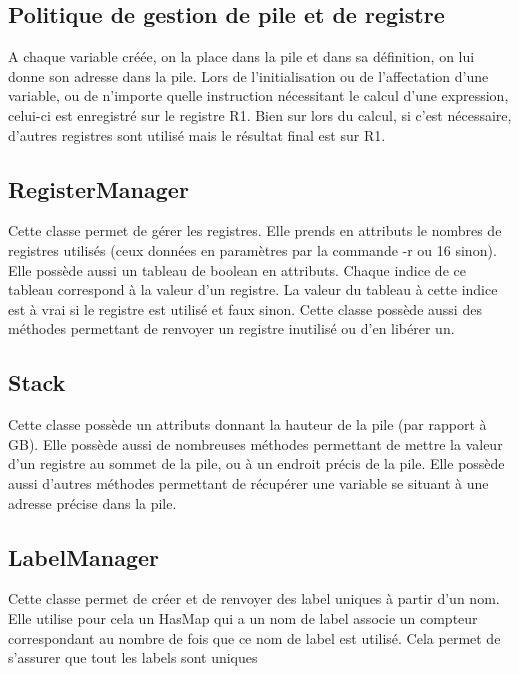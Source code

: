 \documentclass[12pt, a4paper, one side]{article}
\begin{document}
    \subsection{Politique de gestion de pile et de registre}

    A chaque variable créée, on la place dans la pile et dans sa définition, on lui donne son adresse dans la pile.
    Lors de l'initialisation ou de l'affectation d'une variable, ou de n'importe quelle instruction nécessitant le
    calcul d'une expression, celui-ci est enregistré sur le registre R1. Bien sur lors du calcul, si c'est nécessaire,
    d'autres registres sont utilisé mais le résultat final est sur R1.

    \subsection{RegisterManager}

    Cette classe permet de gérer les registres. Elle prends en attributs le nombres de registres utilisés
    (ceux données en paramètres par la commande -r ou 16 sinon). Elle possède aussi un tableau de boolean
    en attributs. Chaque indice de ce tableau correspond à la valeur d'un registre. La valeur du tableau
    à cette indice est à vrai si le registre est utilisé et faux sinon. Cette classe possède aussi des
    méthodes permettant de renvoyer un registre inutilisé ou d'en libérer un.

    \subsection{Stack}

    Cette classe possède un attributs donnant la hauteur de la pile (par rapport à GB). Elle possède aussi
    de nombreuses méthodes permettant de mettre la valeur d'un registre au sommet de la pile, ou à un
    endroit précis de la pile. Elle possède aussi d'autres méthodes permettant de récupérer une variable
    se situant à une adresse précise dans la pile.

    \subsection{LabelManager}

    Cette classe permet de créer et de renvoyer des label uniques à partir d'un nom. Elle utilise pour cela un HasMap
    qui a un nom de label associe un compteur correspondant au nombre de fois que ce nom de label est utilisé. Cela
    permet de s'assurer que tout les labels sont uniques
\end{document}
